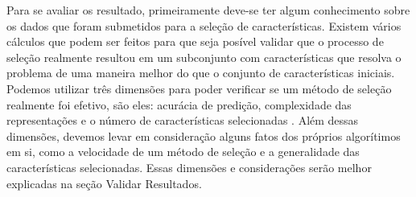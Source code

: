 Para se avaliar os resultado, primeiramente deve-se ter algum conhecimento sobre os dados que foram submetidos para a seleção de características. Existem vários cálculos que podem ser feitos para que seja posível validar que o processo de seleção realmente resultou em um subconjunto com características que resolva o problema de uma maneira melhor do que o conjunto de características iniciais. Podemos utilizar três dimensões para poder verificar se um método de seleção realmente foi efetivo, são eles: acurácia de predição, complexidade das representações e o número de características selecionadas \cite{huan_1998}. Além dessas dimensões, devemos levar em consideração alguns fatos dos próprios algorítimos em si, como a velocidade de um método de seleção e a generalidade das características selecionadas. Essas dimensões e considerações serão melhor explicadas na seção Validar Resultados.

